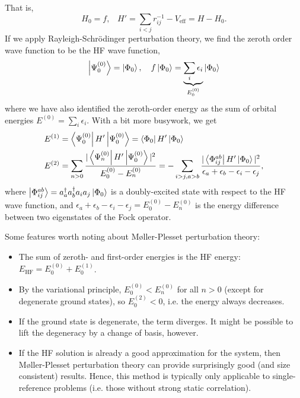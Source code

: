 That is,
\begin{equation}
    H_0 = f, \hspace{10pt} H' = \sum_{i<j} r_{ij}^{-1}-V_\mathrm{eff} = H-H_0.
\end{equation}
If we apply Rayleigh-Schr\"odinger perturbation theory, we find the zeroth order wave function to be the \gls{HF} wave function,
\begin{equation}
    \ket{\Psi_0^{(0)}} = \ket{\Phi_0}, \hspace{10pt}
    f\ket{\Phi_0} = \underbrace{\sum_i\epsilon_i}_{E_0^{(0)}}\ket{\Phi_0}
\end{equation}
where we have also identified the zeroth-order energy as the sum of orbital energies $E^{(0)}=\sum_i\epsilon_i$. With a bit more busywork, we get
\begin{align}
    E^{(1)} &= \bra{\Psi_0^{(0)}}H'\ket{\Psi_0^{(0)}} = \bra{\Phi_0}H'\ket{\Phi_0} \\
    E^{(2)} &=
    \sum_{n>0} \frac{|\bra{\Psi_n^{(0)}}H'\ket{\Psi_0^{(0)}}|^2}{E_0^{(0)}-E_n^{(0)}} =
    -\sum_{i>j,a>b}\frac{|\bra{\Phi_{ij}^{ab}}H'\ket{\Phi_0}|^2}{\epsilon_a+\epsilon_b-\epsilon_i-\epsilon_j},
\end{align}
where $\ket{\Phi_{ij}^{ab}}=a_a^\dag a_b^\dag a_ia_j\ket{\Phi_0}$ is a doubly-excited state with respect to the HF wave function, and $\epsilon_a+\epsilon_b-\epsilon_i-\epsilon_j = E_0^{(0)} - E_n^{(0)}$ is the energy difference between two eigenstates of the Fock operator.

Some features worth noting about M{\o}ller-Plesset perturbation theory:
\begin{itemize}
    \item The sum of zeroth- and first-order energies is the HF energy: $E_\mathrm{HF} = E_0^{(0)} + E_0^{(1)}$.
    \item By the variational principle, $E_0^{(0)}<E_n^{(0)}$ for all $n>0$ (except for degenerate ground states), so $E_0^{(2)}<0$, i.e. the energy always decreases.
    \item If the ground state is degenerate, the term diverges. It might be possible to lift the degeneracy by a change of basis, however.
    \item If the \gls{HF} solution is already a good approximation for the system, then M{\o}ller-Plesset perturbation theory can provide surprisingly good (and size consistent) results. Hence, this method is typically only applicable to single-reference problems (i.e. those without strong static correlation).
\end{itemize}

